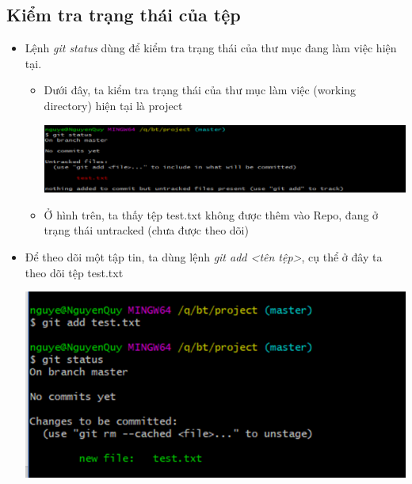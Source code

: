 \documentclass[12pt,a4paper]{report}
\begin{document}
\subsection{Kiểm tra trạng thái của tệp}
\begin{itemize}
\item Lệnh \textit{git status} dùng để kiểm tra trạng thái của thư mục đang làm việc hiện tại.
	\begin{itemize}
		\item Dưới đây, ta kiểm tra trạng thái của thư mục làm việc (working directory) hiện tại là project

	\includegraphics[width=0.8\linewidth]{screenshot007}

	\label{fig:screenshot007}

		\item Ở hình trên, ta thấy tệp test.txt không được thêm vào Repo, đang ở trạng thái untracked (chưa được theo dõi)
	\end{itemize}
\item Để theo dõi một tập tin, ta dùng lệnh {\it git add <tên tệp>}, cụ thể ở đây ta theo dõi tệp test.txt

	\includegraphics[width=0.8\linewidth]{screenshot008}

	\label{fig:screenshot008}
\end{itemize}
\end{document}

